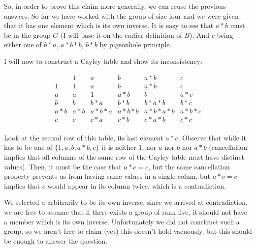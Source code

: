 \documentclass[11pt]{article}
\begin{document}
So, in order to prove this claim more generally, we can reuse the previous
answers.  So far we have worked with the group of size four and we were
given that it has one element which is its own inverse. It is easy to see
that $a*b$ must be in the group $G$ (I will base it on the earlier
definition of $B$).  And $c$ being either one of $b*a$, $a*b*b$, $b*b$ by
pigeonhole principle.

I will now to construct a Cayley table and show its inconsistency:

\[\begin{array}{l|lllll}
  & 1 & a & b & a*b & c \\
 1 & 1 & a & b & a*b & c \\
 a & a & 1 & a*b & b & a*c \\
 b & b & b*a & b*b & b*a*b & b*c \\
 a*b & a*b & a*b*a & a*b*b & a*b*a*b & a*b*c \\
 c & c & c*a & c*b & c*a*b & c*c \\
\end{array}\]

Look at the second row of this table, its last element $a*c$.  Observe that
while it has to be one of $\{1, a, b, a*b, c\}$ it is neither $1$, nor $a$ nor
$b$ nor $a*b$ (cancellation implies that all columns of the same row of the
Cayley table must have distinct values).  Then, it must be the case that
$a*c=c$, but the same cancellation property prevents us from having same
values in a single colum, but $a*c=c$ implies that $c$ would appear in its
column twice, which is a contradiction.

We selected $a$ arbitrarily to be its own inverse, since we arrived at
contradiction, we are free to assume that if there exists a group of rank
five, it should not have a member which is its own inverse.  Unfortunately
we did not construct such a group, so we aren't free to claim (yet) this
doesn't hold vacuously, but this should be enough to answer the question.
\end{document}
